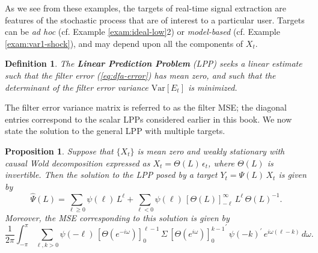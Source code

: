 \documentclass[a4paper]{book}
\newtheorem{Proposition}{Proposition}
\newtheorem{Definition}{Definition}
\begin{document}
As we see from these examples, the targets of real-time signal 
 extraction  are features of the stochastic process that are of interest to 
 a particular user.   Targets can be {\em ad hoc} 
 (cf. Example \ref{exam:ideal-low}2) or {\em model-based} (cf. Example \ref{exam:var1-shock}),
   and may   depend upon  all the components   of $X_t$.    
 

\begin{Definition} \rm
\label{def:lpp2}
 The {\bf Linear Prediction Problem} (LPP) seeks a linear estimate
    such that the filter error (\ref{eq:dfa-error})
 has mean zero, and  such that the determinant of the filter 
    error variance $\mbox{Var} [ E_t ]$ is minimized.
\end{Definition}

The filter error variance matrix is referred to as the filter MSE;
 the diagonal entries correspond to the scalar LPPs considered
 earlier in this book.   We now state the   solution to the general LPP
 with multiple targets.

\begin{Proposition}
 \label{prop:GPP}
 Suppose that $\{ X_t \}$ is mean zero and weakly stationary 
 with  causal Wold decomposition expressed as $X_t = \Theta (L) \, \epsilon_t$,
 where $\Theta (L)$ is invertible.    Then the solution
 to the LPP posed by a   target $Y_t = \Psi (L) \, X_t$ is given by
\begin{equation}
 \label{eq:GPPsoln}
 \widehat{\Psi} (L) = \sum_{\ell \geq 0 } \psi (\ell) \, L^{\ell} + 
 \sum_{\ell < 0 } \psi (\ell)
 \,  { [ \Theta (L) ]}_{-\ell}^{ \infty  } \, L^{\ell} \, {\Theta (L) }^{-1}.
\end{equation}
 Moreover, the   MSE  corresponding to this solution is given by
\begin{equation} 
\label{eq:minimalMSE}
 \frac{1}{ 2 \pi} \int_{-\pi}^{\pi}   \sum_{\ell, k > 0 } \psi (-\ell) \,
  {[ \Theta  (e^{-i \omega}) ]}_0^{\ell-1}   \,  \Sigma \,
  { {[ \Theta  (e^{i \omega}) ]}_0^{ k-1} }^{\prime}  \,
   {\psi (-k) }^{\prime} \,  e^{i \omega (\ell - k) }   \, d\omega.
\end{equation}
 \end{Proposition}

  
\end{document}
